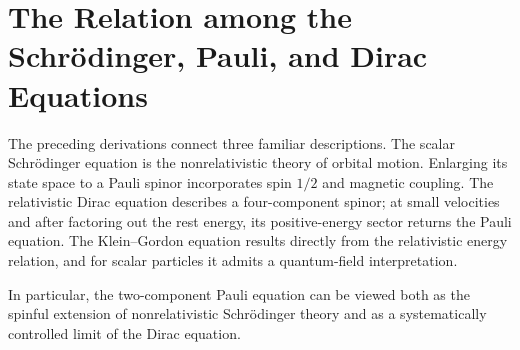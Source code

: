 \section{The Relation among the Schr\"odinger, Pauli, and Dirac Equations}
The preceding derivations connect three familiar descriptions. The scalar Schr\"odinger equation is the nonrelativistic theory of orbital motion. Enlarging its state space to a Pauli spinor incorporates spin $1/2$ and magnetic coupling. The relativistic Dirac equation describes a four-component spinor; at small velocities and after factoring out the rest energy, its positive-energy sector returns the Pauli equation. The Klein--Gordon equation results directly from the relativistic energy relation, and for scalar particles it admits a quantum-field interpretation.

\begin{center}
\end{center}
In particular, the two-component Pauli equation can be viewed both as the spinful extension of nonrelativistic Schr\"odinger theory and as a systematically controlled limit of the Dirac equation.